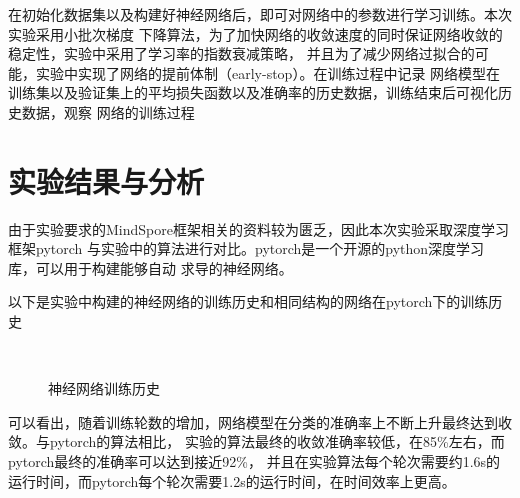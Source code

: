 \documentclass[notitlepage]{article}
\begin{document}
在初始化数据集以及构建好神经网络后，即可对网络中的参数进行学习训练。本次实验采用小批次梯度
下降算法，为了加快网络的收敛速度的同时保证网络收敛的稳定性，实验中采用了学习率的指数衰减策略，
并且为了减少网络过拟合的可能，实验中实现了网络的提前体制（early-stop）。在训练过程中记录
网络模型在训练集以及验证集上的平均损失函数以及准确率的历史数据，训练结束后可视化历史数据，观察
网络的训练过程

\section{实验结果与分析}

由于实验要求的MindSpore框架相关的资料较为匮乏，因此本次实验采取深度学习框架pytorch
与实验中的算法进行对比。pytorch是一个开源的python深度学习库，可以用于构建能够自动
求导的神经网络。

以下是实验中构建的神经网络的训练历史和相同结构的网络在pytorch下的训练历史

\begin{figure}[htbp]
	\centering
	\\
	\caption{神经网络训练历史}
\end{figure}

可以看出，随着训练轮数的增加，网络模型在分类的准确率上不断上升最终达到收敛。与pytorch的算法相比，
实验的算法最终的收敛准确率较低，在85\%左右，而pytorch最终的准确率可以达到接近92\%，
并且在实验算法每个轮次需要约1.6s的运行时间，而pytorch每个轮次需要1.2s的运行时间，在时间效率上更高。
\end{document}
